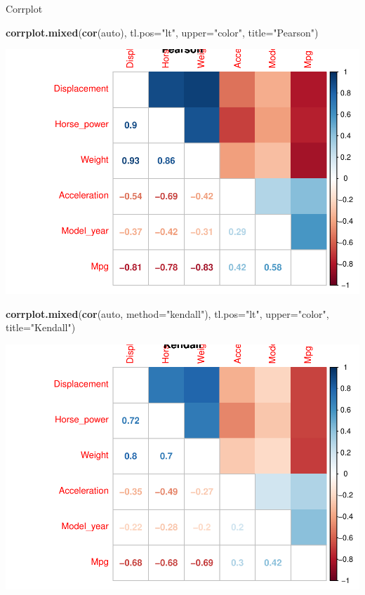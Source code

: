 \documentclass[
]{article}
\newenvironment{Shaded}{\begin{snugshade}}{\end{snugshade}}
\newcommand{\DataTypeTok}[1]{\textcolor[rgb]{0.13,0.29,0.53}{#1}}
\newcommand{\KeywordTok}[1]{\textcolor[rgb]{0.13,0.29,0.53}{\textbf{#1}}}
\newcommand{\NormalTok}[1]{#1}
\newcommand{\StringTok}[1]{\textcolor[rgb]{0.31,0.60,0.02}{#1}}
\begin{document}
Corrplot

\begin{Shaded}
\begin{Highlighting}[]
\KeywordTok{corrplot.mixed}\NormalTok{(}\KeywordTok{cor}\NormalTok{(auto), }\DataTypeTok{tl.pos=}\StringTok{"lt"}\NormalTok{, }\DataTypeTok{upper=}\StringTok{"color"}\NormalTok{, }\DataTypeTok{title=}\StringTok{"Pearson"}\NormalTok{)}
\end{Highlighting}
\end{Shaded}

\begin{center}\includegraphics{EDA_files/figure-latex/unnamed-chunk-19-1} \end{center}

\begin{Shaded}
\begin{Highlighting}[]
\KeywordTok{corrplot.mixed}\NormalTok{(}\KeywordTok{cor}\NormalTok{(auto, }\DataTypeTok{method=}\StringTok{"kendall"}\NormalTok{), }\DataTypeTok{tl.pos=}\StringTok{"lt"}\NormalTok{, }\DataTypeTok{upper=}\StringTok{"color"}\NormalTok{, }\DataTypeTok{title=}\StringTok{"Kendall"}\NormalTok{)}
\end{Highlighting}
\end{Shaded}

\begin{center}\includegraphics{EDA_files/figure-latex/unnamed-chunk-19-2} \end{center}
\end{document}
